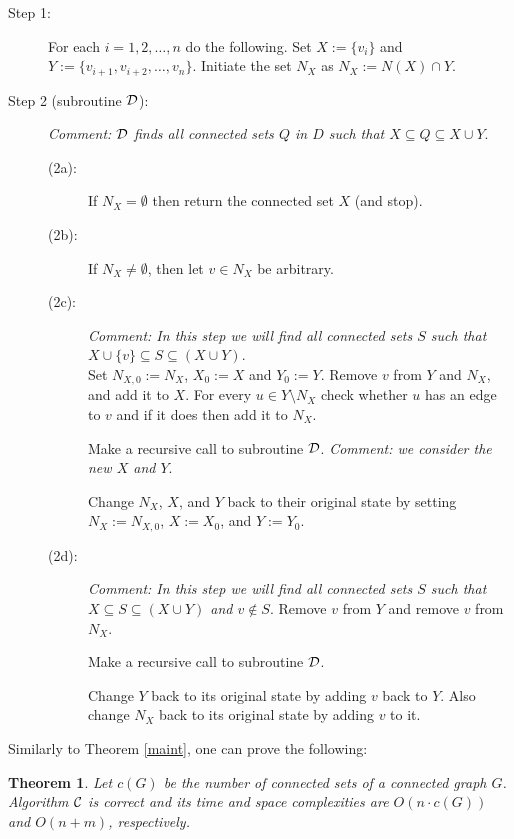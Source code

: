 \documentclass[11pt]{article}
\newcommand{\2}{\vspace{0.2 cm}}
\newtheorem{theorem}{Theorem}[section]
\begin{document}
\begin{description}
\item[Step 1:]
For each $i=1,2,\ldots,n$ do the following.  Set $X:=\{v_i\}$ and
$Y:=\{v_{i+1},v_{i+2}, \ldots, v_{n} \}$. Initiate the set $N_X$ as
$N_X:=N(X) \cap Y$.

\item[Step 2 (subroutine ${\cal D}$):]
{\em Comment: $\cal D$ finds all connected sets $Q$ in $D$ such that
$X \subseteq Q \subseteq X \cup Y$}.

\begin{description}
\item[(2a):] If $N_X=\emptyset$ then return the connected set $X$ (and stop).

\item[(2b):] If $N_X \not=\emptyset$, then let $v \in N_X$ be arbitrary.

\item[(2c):]  {\em Comment: In this step we will find all connected sets $S$
such that $X\cup\{v\} \subseteq S \subseteq (X \cup Y)$}.\\
Set
$N_{X,0}:=N_X$, $X_0:=X$ and $Y_0:=Y$. Remove $v$ from $Y$ and
$N_X$, and add it to $X$. For every $u \in Y\setminus N_X$ check
whether $u$ has an edge to $v$ and if it does then add it to $N_X$.

\2 Make a recursive call to subroutine ${\cal D}$. {\em Comment: we
consider the new $X$ and $Y$}.

\2 Change $N_X$, $X$, and $Y$ back to their original state by
setting $N_X:=N_{X,0}$, $X:=X_0$, and $Y:=Y_0$.

\item[(2d):] {\em Comment: In this step we will find all connected
sets $S$  such that $X \subseteq S \subseteq (X \cup Y)$ and $v
\not\in S$}. Remove $v$ from $Y$ and remove $v$ from $N_X$.

\2

Make a recursive call to subroutine ${\cal D}$.

\2

Change $Y$ back to its original state by adding $v$ back to $Y$.
Also change $N_X$ back to its original state by adding $v$ to it.
\end{description}
\end{description}

Similarly to Theorem \ref{maint}, one can prove the following:

\begin{theorem}
Let $c(G)$ be the number of connected sets of a connected graph $G$.
Algorithm $\cal C$ is correct and its time and space complexities
are $O(n\cdot c(G))$ and $O(n+m)$, respectively.
\end{theorem}
\end{document}
